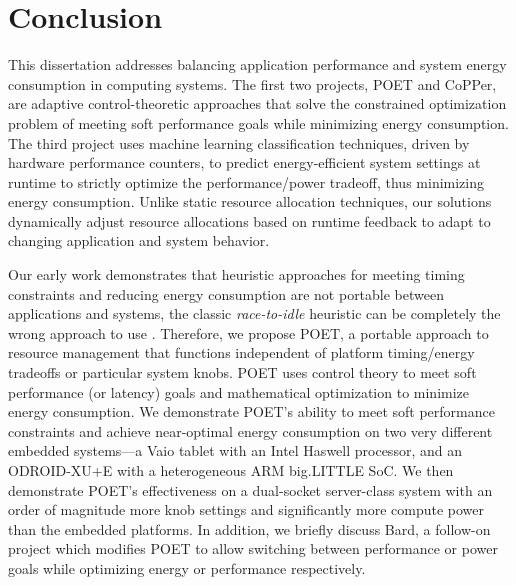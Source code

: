\chapter{Conclusion}

This dissertation addresses balancing application performance and system energy consumption in computing systems.
The first two projects, POET and CoPPer, are adaptive control-theoretic approaches that solve the constrained optimization problem of meeting soft performance goals while minimizing energy consumption.
The third project uses machine learning classification techniques, driven by hardware performance counters, to predict energy-efficient system settings at runtime to strictly optimize the performance/power tradeoff, thus minimizing energy consumption.
Unlike static resource allocation techniques, our solutions dynamically adjust resource allocations based on runtime feedback to adapt to changing application and system behavior.

Our early work demonstrates that heuristic approaches for meeting timing constraints and reducing energy consumption are not portable between applications and systems, \eg the classic \emph{race-to-idle} heuristic can be completely the wrong approach to use \cite{Imes2014}.
Therefore, we propose POET, a portable approach to resource management that functions independent of platform timing/energy tradeoffs or particular system knobs.
POET uses control theory to meet soft performance (or latency) goals and mathematical optimization to minimize energy consumption.
We demonstrate POET's ability to meet soft performance constraints and achieve near-optimal energy consumption on two very different embedded systems---a Vaio tablet with an Intel Haswell processor, and an ODROID-XU+E with a heterogeneous ARM big.LITTLE SoC.
We then demonstrate POET's effectiveness on a dual-socket server-class system with an order of magnitude more knob settings and significantly more compute power than the embedded platforms.
In addition, we briefly discuss Bard, a follow-on project which modifies POET to allow switching between performance or power goals while optimizing energy or performance respectively.

